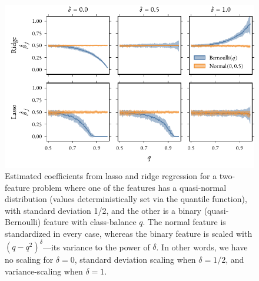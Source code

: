 \begin{figure}[htpb]
  \centering
  \includegraphics[]{figures/mixed_data_thesis.pdf}
  \caption{%
    Estimated coefficients from lasso and ridge regression for a two-feature problem where one of the features has a quasi-normal distribution (values deterministically set via the quantile function), with standard deviation 1/2, and the other is a binary (quasi-Bernoulli) feature with class-balance \(q\). The normal feature is standardized in every case, whereas the binary feature is scaled with \((q - q^2)^\delta\)---its variance to the power of \(\delta\). In other words, we have no scaling for \(\delta=0\), standard deviation scaling when \(\delta=1/2\), and variance-scaling when \(\delta = 1\).
  }
  \label{fig:paper6-highlight}
\end{figure}
